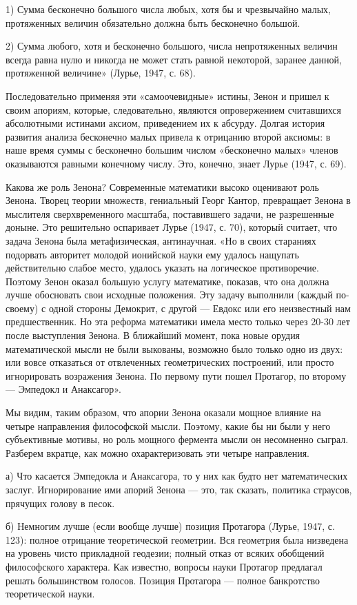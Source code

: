 1) Сумма бесконечно большого числа любых, хотя бы и чрезвычайно
малых, протяженных величин обязательно должна быть бесконечно большой.

2) Сумма любого, хотя и бесконечно большого, числа непротяженных
величин всегда равна нулю и никогда не может стать равной некоторой,
заранее данной, протяженной величине» (Лурье, 1947, с. 68).

Последовательно применяя эти «самоочевидные» истины, Зенон и пришел к
своим апориям, которые, следовательно, являются опровержением
считавшихся абсолютными истинами аксиом, приведением их к абсурду.
Долгая история развития анализа бесконечно малых привела к отрицанию
второй аксиомы: в наше время суммы с бесконечно большим числом
«бесконечно малых» членов оказываются равными конечному числу. Это,
конечно, знает Лурье (1947, с. 69).

Какова же роль Зенона? Современные математики высоко оценивают роль
Зенона. Творец теории множеств, гениальный Георг Кантор, превращает
Зенона в мыслителя сверхвременного масштаба, поставившего задачи, не
разрешенные доныне. Это решительно оспаривает Лурье (1947, с. 70),
который считает, что задача Зенона была метафизическая, антинаучная.
«Но в своих стараниях подорвать авторитет молодой ионийской науки ему
удалось нащупать действительно слабое место, удалось указать на
логическое противоречие. Поэтому Зенон оказал большую услугу
математике, показав, что она должна лучше обосновать свои исходные
положения. Эту задачу выполнили (каждый по-своему) с одной стороны
Демокрит, с другой --- Евдокс или его неизвестный нам предшественник.
Но эта реформа математики имела место только через 20-30 лет после
выступления Зенона. В ближайший момент, пока новые орудия
математической мысли не были выкованы, возможно было только одно из
двух: или вовсе отказаться от отвлеченных геометрических построений,
или просто игнорировать возражения Зенона. По первому пути пошел
Протагор, по второму --- Эмпедокл и Анаксагор».

Мы видим, таким образом, что апории Зенона оказали мощное влияние на
четыре направления философской мысли. Поэтому, какие бы ни были у него
субъективные мотивы, но роль мощного фермента мысли он несомненно
сыграл. Разберем вкратце, как можно охарактеризовать эти четыре
направления.

а) Что касается Эмпедокла и Анаксагора, то у них как будто нет
математических заслуг. Игнорирование ими апорий Зенона --- это, так
сказать, политика страусов, прячущих голову в песок.

б) Немногим лучше (если вообще лучше) позиция Протагора (Лурье, 1947,
с. 123): полное отрицание теоретической геометрии. Вся геометрия была
низведена на уровень чисто прикладной геодезии; полный отказ от всяких
обобщений философского характера. Как известно, вопросы науки Протагор
предлагал решать большинством голосов. Позиция Протагора --- полное
банкротство теоретической науки.

